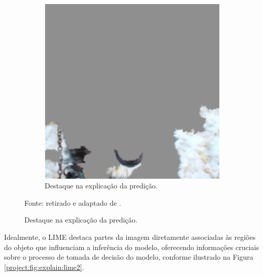 \begin{figure}[H]
\begin{subfigure}[t]{0.5\textwidth}
        \centering
        \includegraphics[width=1\linewidth]{recursos/imagens/project/fundo_husky.png}
        \caption{Destaque na explicação da predição.}
        \label{project:fig:explain:lime1.2}
    \end{subfigure}%

    Fonte: retirado e adaptado de \cite{Ribeiro2016WhyClassifier}.
\end{figure}

Idealmente, o LIME destaca partes da imagem diretamente associadas às regiões do objeto que influenciam a inferência do modelo, oferecendo informações cruciais sobre o processo de tomada de decisão do modelo, conforme ilustrado na Figura \ref{project:fig:explain:lime2}.

